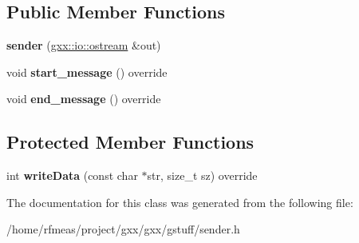 \subsection*{Public Member Functions}
\begin{DoxyCompactItemize}
\item 
{\bfseries sender} (\hyperlink{classgxx_1_1io_1_1ostream}{gxx\+::io\+::ostream} \&out)\hypertarget{classgxx_1_1gstuff_1_1sender_ae90718c36915fc2670e8a4cf391c60a9}{}\label{classgxx_1_1gstuff_1_1sender_ae90718c36915fc2670e8a4cf391c60a9}

\item 
void {\bfseries start\+\_\+message} () override\hypertarget{classgxx_1_1gstuff_1_1sender_a483dbf66c78894b3c8743e91df1d9e94}{}\label{classgxx_1_1gstuff_1_1sender_a483dbf66c78894b3c8743e91df1d9e94}

\item 
void {\bfseries end\+\_\+message} () override\hypertarget{classgxx_1_1gstuff_1_1sender_a3ed1867f9e12d914f0bbe7da517d6740}{}\label{classgxx_1_1gstuff_1_1sender_a3ed1867f9e12d914f0bbe7da517d6740}

\end{DoxyCompactItemize}
\subsection*{Protected Member Functions}
\begin{DoxyCompactItemize}
\item 
int {\bfseries write\+Data} (const char $\ast$str, size\+\_\+t sz) override\hypertarget{classgxx_1_1gstuff_1_1sender_af70334bda55500ddaa9a0d224a8ccf39}{}\label{classgxx_1_1gstuff_1_1sender_af70334bda55500ddaa9a0d224a8ccf39}

\end{DoxyCompactItemize}


The documentation for this class was generated from the following file\+:\begin{DoxyCompactItemize}
\item 
/home/rfmeas/project/gxx/gxx/gstuff/sender.\+h\end{DoxyCompactItemize}
